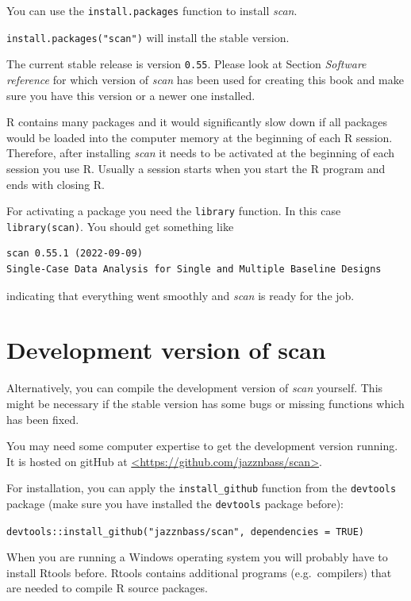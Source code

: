 \documentclass[
  letterpaper,
  DIV=11,
  numbers=noendperiod]{scrreprt}
\begin{document}
You can use the \texttt{install.packages} function to install
\emph{scan}.

\texttt{install.packages("scan")} will install the stable version.

The current stable release is version \texttt{0.55}. Please look at
Section \emph{Software reference} for which version of \emph{scan} has
been used for creating this book and make sure you have this version or
a newer one installed.

R contains many packages and it would significantly slow down if all
packages would be loaded into the computer memory at the beginning of
each R session. Therefore, after installing \emph{scan} it needs to be
activated at the beginning of each session you use R. Usually a session
starts when you start the R program and ends with closing R.

For activating a package you need the \texttt{library} function. In this
case \texttt{library(scan)}. You should get something like

\begin{verbatim}
scan 0.55.1 (2022-09-09)
Single-Case Data Analysis for Single and Multiple Baseline Designs
\end{verbatim}

indicating that everything went smoothly and \emph{scan} is ready for
the job.

\hypertarget{development-version-of-scan}{%
\section{Development version of
scan}\label{development-version-of-scan}}

Alternatively, you can compile the development version of \emph{scan}
yourself. This might be necessary if the stable version has some bugs or
missing functions which has been fixed.

You may need some computer expertise to get the development version
running. It is hosted on gitHub at
\href{https://github.com/jazznbass/scan}{\textless https://github.com/jazznbass/scan\textgreater{}}.

For installation, you can apply the \texttt{install\_github} function
from the \texttt{devtools} package (make sure you have installed the
\texttt{devtools} package before):

\texttt{devtools::install\_github("jazznbass/scan",\ dependencies\ =\ TRUE)}

When you are running a Windows operating system you will probably have
to install Rtools before. Rtools contains additional programs
(e.g.~compilers) that are needed to compile R source packages.
\end{document}
